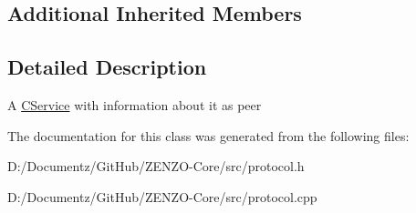\subsection*{Additional Inherited Members}


\subsection{Detailed Description}
A \mbox{\hyperlink{class_c_service}{C\+Service}} with information about it as peer 

The documentation for this class was generated from the following files\+:\begin{DoxyCompactItemize}
\item 
D\+:/\+Documentz/\+Git\+Hub/\+Z\+E\+N\+Z\+O-\/\+Core/src/protocol.\+h\item 
D\+:/\+Documentz/\+Git\+Hub/\+Z\+E\+N\+Z\+O-\/\+Core/src/protocol.\+cpp\end{DoxyCompactItemize}
